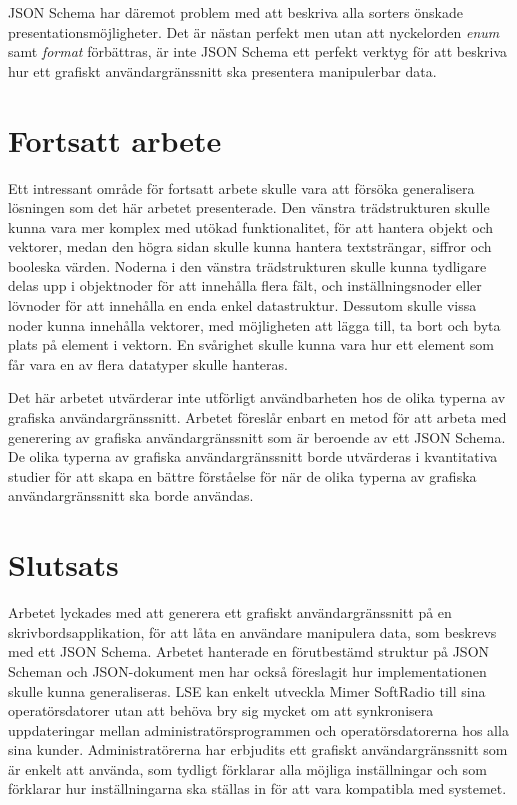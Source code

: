JSON Schema har däremot problem med att beskriva alla sorters önskade presentationsmöjligheter. Det är nästan perfekt men utan att nyckelorden \textit{enum} samt \textit{format} förbättras, är inte JSON Schema ett perfekt verktyg för att beskriva hur ett grafiskt användargränssnitt ska presentera manipulerbar data.


\section{Fortsatt arbete}
\label{sec:slutsats:fortsatt-arbete}
Ett intressant område för fortsatt arbete skulle vara att försöka generalisera lösningen som det här arbetet presenterade. Den vänstra trädstrukturen skulle kunna vara mer komplex med utökad funktionalitet, för att hantera objekt och vektorer, medan den högra sidan skulle kunna hantera textsträngar, siffror och booleska värden. Noderna i den vänstra trädstrukturen skulle kunna tydligare delas upp i objektnoder för att innehålla flera fält, och inställningsnoder eller lövnoder för att innehålla en enda enkel datastruktur. Dessutom skulle vissa noder kunna innehålla vektorer, med möjligheten att lägga till, ta bort och byta plats på element i vektorn. En svårighet skulle kunna vara hur ett element som får vara en av flera datatyper skulle hanteras.

Det här arbetet utvärderar inte utförligt användbarheten hos de olika typerna av grafiska användargränssnitt. Arbetet föreslår enbart en metod för att arbeta med generering av grafiska användargränssnitt som är beroende av ett JSON Schema. De olika typerna av grafiska användargränssnitt borde utvärderas i kvantitativa studier för att skapa en bättre förståelse för när de olika typerna av grafiska användargränssnitt ska borde användas.


\section{Slutsats}
\label{sec:slutsats:slutsats}
Arbetet lyckades med att generera ett grafiskt användargränssnitt på en skrivbordsapplikation, för att låta en användare manipulera data, som beskrevs med ett JSON Schema. Arbetet hanterade en förutbestämd struktur på JSON Scheman och JSON-dokument men har också föreslagit hur implementationen skulle kunna generaliseras. LSE kan enkelt utveckla Mimer SoftRadio till sina operatörsdatorer utan att behöva bry sig mycket om att synkronisera uppdateringar mellan administratörsprogrammen och operatörsdatorerna hos alla sina kunder. Administratörerna har erbjudits ett grafiskt användargränssnitt som är enkelt att använda, som tydligt förklarar alla möjliga inställningar och som förklarar hur inställningarna ska ställas in för att vara kompatibla med systemet.

